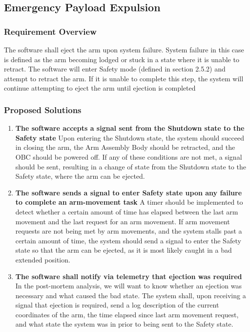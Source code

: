 \documentclass[letterpaper,10pt]{article}
\begin{document}
\subsection{Emergency Payload Expulsion}
\subsubsection{Requirement Overview}
The software shall eject the arm upon system failure. 
System failure in this case is defined as the arm becoming lodged or stuck in a state where it is unable to retract.
The software will enter Safety mode (defined in section 2.5.2) and attempt to retract the arm. If it is unable to complete this step,
 the system will continue attempting to eject the arm until ejection is completed
\subsubsection{Proposed Solutions}
\begin{enumerate}
\item{
\textbf{The software accepts a signal sent from the Shutdown state to the Safety state}
Upon entering the Shutdown state, the system should succeed in closing the arm, the Arm Assembly Body should be retracted, 
and the OBC should be powered off. If any of these conditions are not met, a signal should be sent, resulting in a change of state
from the Shutdown state to the Safety state, where the arm can be ejected.
}
\item{
	\textbf{The software sends a signal to enter Safety state upon any failure to complete an arm-movement task}
A timer should be implemented to detect whether a certain amount of time has elapsed between the last arm movement and the last 
request for an arm movement. If arm movement requests are not being met by arm movements, and the system stalls past a certain amount 
of time, the system should send a signal to enter the Safety state so that the arm can be ejected, as it is most likely caught
in a bad extended position.
}
\item{
	\textbf{The software shall notify via telemetry that ejection was required}
In the post-mortem analysis, we will want to know whether an ejection was necessary and what caused the bad state. The system
shall, upon receiving a signal that ejection is required, send a log description of the current coordinates of the arm, the time 
elapsed since last arm movement request, and what state the system was in prior to being sent to the Safety state.
}
\end{enumerate}
\end{document}
